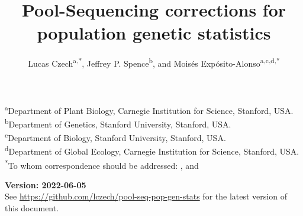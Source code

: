 \documentclass[a4paper,fontsize=9pt,DIV=14]{scrartcl}
\title{Pool-Sequencing corrections for population genetic statistics}
\author{\orcid{0000-0002-1340-9644} Lucas Czech\textsuperscript{a,*}, \orcid{0000-0002-3199-1447} Jeffrey P. Spence\textsuperscript{b}, and \orcid{0000-0001-5711-0700} Moisés Expósito-Alonso\textsuperscript{a,c,d,*}}
\date{}
\newcommand{\beginsupplement}{%
    \setcounter{table}{0}
    \renewcommand{\thetable}{\arabic{table}}%
    \setcounter{figure}{0}
    \renewcommand{\thefigure}{\arabic{figure}}%
}
\begin{document}


\begingroup
\let\center\flushleft
\let\endcenter\endflushleft
\maketitle
\endgroup
\vspace*{-3.5em}
\textsuperscript{a}{Department of Plant Biology, Carnegie Institution for Science, Stanford, USA.\\}
\textsuperscript{b}{Department of Genetics, Stanford University, Stanford, USA.\\}
\textsuperscript{c}{Department of Biology, Stanford University, Stanford, USA.\\}
\textsuperscript{d}{Department of Global Ecology, Carnegie Institution for Science, Stanford, USA.\\}
\textsuperscript{*}{To whom correspondence should be addressed: \href{mailto:lczech@carnegiescience.edu}{\color{black}{lczech@carnegiescience.edu}},
and \href{mailto:moisesexpositoalonso@gmail.com}{\color{black}{moisesexpositoalonso@gmail.com}}}




\textbf{Version: 2022-06-05} \\
See \url{https://github.com/lczech/pool-seq-pop-gen-stats} for the latest version of this document.
\end{document}
